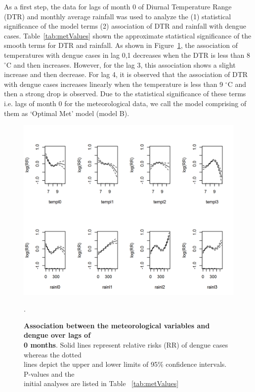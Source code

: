 \documentclass{bmcart}
\begin{document}
As a first step, the data for lags of month 0 of Diurnal Temperature Range (DTR) and monthly average rainfall was used to analyze the (1) statistical significance of the model terms (2) association of DTR and rainfall with dengue cases. Table~\ref{tab:metValues} shown the approximate statistical significance of the smooth terms for DTR and rainfall. As shown in Figure~\ref{figure:D-M-1}, the association of temperatures with dengue cases in lag 0,1 decreases when the DTR is less than 8 $^{\circ}$C and then increases. However, for the lag 3, this association shows a slight increase and then decrease. For lag 4, it is observed that the association of DTR with dengue cases increases linearly when the temperature is less than 9 $^{\circ}$C  and then a strong drop is observed. Due to the statistical significance of these terms i.e. lags of month 0 for the meteorological data, we call the model comprising of them as `Optimal Met' model (model B). 

\begin{figure}[htbp]
	\begin{center}
		\includegraphics[width= 1.0\textwidth]{6-DM1}
		\caption{\textbf{Association between the meteorological variables and dengue over lags of \\ 0 months}. Solid lines represent relative risks (RR) of dengue cases whereas the dotted \\ lines depict the upper and lower limits of 95\%  confidence intervals. P-values and the \\ initial analyses are listed in Table ~\ref{tab:metValues}}
		\label{figure:D-M-1}.
	\end{center}
\end{figure}
\end{document}
